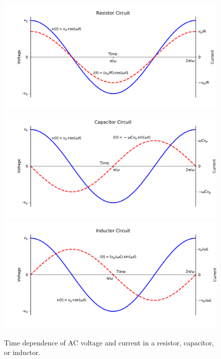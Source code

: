 \documentclass[12pt,oneside]{book}
\begin{document}
\begin{figure}[htbp]
\begin{center}
\includegraphics[height=0.3\textheight]{figs/vit_res.pdf} \\
\includegraphics[height=0.3\textheight]{figs/vit_cap.pdf} \\
\includegraphics[height=0.3\textheight]{figs/vit_ind.pdf} \\
\caption{ Time dependence of AC voltage and current in a resistor, capacitor, or inductor.}
\label{fig:vit}
\end{center}
\end{figure}
\end{document}
